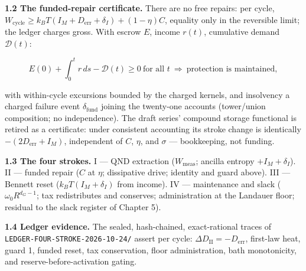 \documentclass[
]{article}
\begin{document}
\textbf{1.2 The funded-repair certificate.} There are no free repairs:
per cycle,
\(W_{\mathrm{cycle}}\ge k_BT(I_M+D_{\mathrm{err}}+\delta_I)+(1-\eta)C\),
equality only in the reversible limit; the ledger charges gross. With
escrow \(E\), income \(r(t)\), cumulative demand \(\mathcal D(t)\):

\[
E(0)+\int_0^t r\,ds-\mathcal D(t)\ge0\ \text{for all }t\ \Longrightarrow\ \text{protection is maintained},
\]

with within-cycle excursions bounded by the charged kernels, and
insolvency a charged failure event \(\delta_{\mathrm{fund}}\) joining
the twenty-one accounts (tower/union composition; no independence). The
draft series' compound storage functional is retired as a certificate:
under consistent accounting its stroke change is identically
\(-(2D_{\mathrm{err}}+I_M)\), independent of \(C\), \(\eta\), and
\(\sigma\) --- bookkeeping, not funding.

\textbf{1.3 The four strokes.} I --- QND extraction
(\(W_{\mathrm{meas}}\); ancilla entropy \(+I_M+\delta_I\)). II ---
funded repair (\(C\) at \(\eta\); dissipative drive; identity and guard
above). III --- Bennett reset (\(k_BT(I_M+\delta_I)\) from income). IV
--- maintenance and slack (\(\omega_0R^{d_G-1}\); tax redistributes and
conserves; administration at the Landauer floor; residual to the slack
register of Chapter 5).

\textbf{1.4 Ledger evidence.} The sealed, hash-chained, exact-rational
traces of
\texttt{L\allowbreak{}E\allowbreak{}D\allowbreak{}G\allowbreak{}E\allowbreak{}R\allowbreak{}-\allowbreak{}F\allowbreak{}O\allowbreak{}U\allowbreak{}R\allowbreak{}-\allowbreak{}S\allowbreak{}T\allowbreak{}R\allowbreak{}O\allowbreak{}K\allowbreak{}E\allowbreak{}-\allowbreak{}2\allowbreak{}0\allowbreak{}2\allowbreak{}6\allowbreak{}-\allowbreak{}1\allowbreak{}0\allowbreak{}-\allowbreak{}2\allowbreak{}4\allowbreak{}/}
assert per cycle: \(\Delta D_{\mathrm{II}}=-D_{\mathrm{err}}\),
first-law heat, guard 1, funded reset, tax conservation, floor
administration, bath monotonicity, and reserve-before-activation gating.
\end{document}
